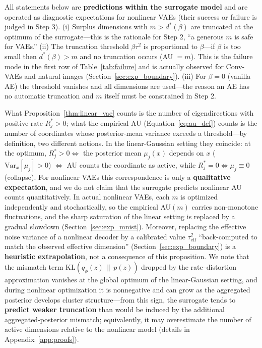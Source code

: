 \documentclass[make,article,submit,pdftex,moreauthors]{Definitions/mdpi}
\newcommand{\dstar}{d^{*}(\beta)}
\begin{document}
\begin{Remark}\label{rem:implication}
All statements below are \textbf{predictions within the surrogate model}
and are operated as diagnostic expectations for nonlinear VAEs (their
success or failure is judged in Step 3).
(i) Surplus dimensions with $m > \dstar$ are truncated at the optimum of
the surrogate---this is the rationale for Step 2, ``a generous $m$ is safe
for VAEs.''
(ii) The truncation threshold $\beta\tau^2$ is proportional to $\beta$---if
$\beta$ is too small then $\dstar > m$ and no truncation occurs
(AU $= m$).
This is the failure mode in the first row of Table~\ref{tab:failure} and is
actually observed for Conv-VAEs and natural images
(Section~\ref{sec:exp_boundary}).
(iii) For $\beta = 0$ (vanilla AE) the threshold vanishes and all
dimensions are used---the reason an AE has no automatic truncation and $m$
itself must be constrained in Step 2.
\end{Remark}

\begin{Remark}\label{rem:bridge}
What Proposition~\ref{thm:linear_vae} counts is the number of
eigendirections with positive rate $R_j^* > 0$; what the empirical AU
(Equation~\eqref{eq:au_def}) counts is the number of coordinates whose
posterior-mean variance exceeds a threshold---by definition, two different
notions.
In the linear-Gaussian setting they coincide: at the optimum,
$R_j^* > 0 \iff$ the posterior mean $\mu_j(x)$ depends on $x$
($\mathrm{Var}_x[\mu_j] > 0$) $\iff$ AU counts the coordinate as active,
while $R_j^* = 0 \iff \mu_j \equiv 0$ (collapse).
For nonlinear VAEs this correspondence is only a \textbf{qualitative
expectation}, and we do not claim that the surrogate predicts nonlinear AU
counts quantitatively.
In actual nonlinear VAEs, each $m$ is optimized independently and
stochastically, so the empirical AU$(m)$ carries non-monotone fluctuations,
and the sharp saturation of the linear setting is replaced by a gradual
slowdown (Section~\ref{sec:exp_mnist}).
Moreover, replacing the effective noise variance of a nonlinear decoder by a
calibrated value $\tau^2_{\mathrm{eff}}$ ``back-computed to match the
observed effective dimension'' (Section~\ref{sec:exp_boundary}) is a
\textbf{heuristic extrapolation}, not a consequence of this proposition.
We note that the mismatch term $\mathrm{KL}(q_\phi(z)\,\|\,p(z))$ dropped by
the rate--distortion approximation vanishes at the global optimum of the
linear-Gaussian setting, and during nonlinear optimization it is
nonnegative and can grow as the aggregated posterior develops cluster
structure---from this sign, the surrogate tends to \textbf{predict weaker
truncation} than would be induced by the additional aggregated-posterior
mismatch; equivalently, it may overestimate the number of active dimensions
relative to the nonlinear model (details in Appendix~\ref{app:proofs}).
\end{Remark}
\end{document}
